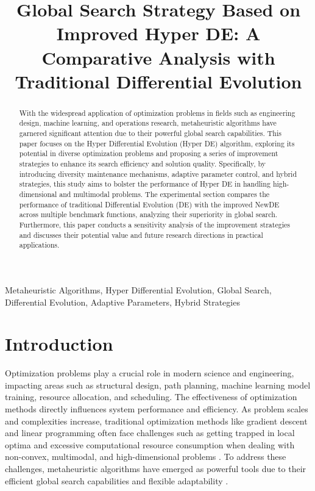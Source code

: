 \documentclass[conference]{IEEEtran}
\title{Global Search Strategy Based on Improved Hyper DE: A Comparative Analysis with Traditional Differential Evolution}
\author{
\IEEEauthorblockN{Tse-Lin Li}
\IEEEauthorblockA{
\textit{Department of Computer Science} \\
\textit{Fu Jen Catholic University} \\
New Taipei City, Taiwan \\
511172176@m365.fju.edu.tw}
}
\begin{document}
\maketitle

\begin{abstract}
With the widespread application of optimization problems in fields such as engineering design, machine learning, and operations research, metaheuristic algorithms have garnered significant attention due to their powerful global search capabilities. This paper focuses on the Hyper Differential Evolution (Hyper DE) algorithm, exploring its potential in diverse optimization problems and proposing a series of improvement strategies to enhance its search efficiency and solution quality. Specifically, by introducing diversity maintenance mechanisms, adaptive parameter control, and hybrid strategies, this study aims to bolster the performance of Hyper DE in handling high-dimensional and multimodal problems. The experimental section compares the performance of traditional Differential Evolution (DE) with the improved NewDE across multiple benchmark functions, analyzing their superiority in global search. Furthermore, this paper conducts a sensitivity analysis of the improvement strategies and discusses their potential value and future research directions in practical applications.
\end{abstract}

\begin{IEEEkeywords}
Metaheuristic Algorithms, Hyper Differential Evolution, Global Search, Differential Evolution, Adaptive Parameters, Hybrid Strategies
\end{IEEEkeywords}

\section{Introduction}

Optimization problems play a crucial role in modern science and engineering, impacting areas such as structural design, path planning, machine learning model training, resource allocation, and scheduling. The effectiveness of optimization methods directly influences system performance and efficiency. As problem scales and complexities increase, traditional optimization methods like gradient descent and linear programming often face challenges such as getting trapped in local optima and excessive computational resource consumption when dealing with non-convex, multimodal, and high-dimensional problems \cite{floudas1999review, pinter1996global, goldberg1989genetic, kennedy1995particle, storn1997differential, eiben1999parameter}. To address these challenges, metaheuristic algorithms have emerged as powerful tools due to their efficient global search capabilities and flexible adaptability \cite{burke2013hyper}.
\end{document}
